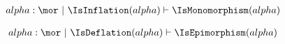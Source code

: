 \begin{sequent}
\begin{align*}
  alpha:\mor ~|~ \IsInflation( alpha ) \vdash \IsMonomorphism( alpha )
\end{align*}
\end{sequent}

\begin{sequent}
\begin{align*}
  alpha:\mor ~|~ \IsDeflation( alpha ) \vdash \IsEpimorphism( alpha )
\end{align*}
\end{sequent}
